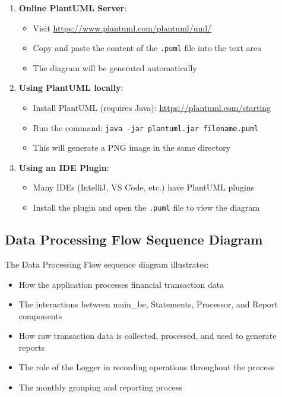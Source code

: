 \documentclass[11pt,a4paper]{report}
\begin{document}
\begin{enumerate}
    \item \textbf{Online PlantUML Server}:
    \begin{itemize}
        \item Visit \url{https://www.plantuml.com/plantuml/uml/}
        \item Copy and paste the content of the \texttt{.puml} file into the text area
        \item The diagram will be generated automatically
    \end{itemize}
    
    \item \textbf{Using PlantUML locally}:
    \begin{itemize}
        \item Install PlantUML (requires Java): \url{https://plantuml.com/starting}
        \item Run the command: \texttt{java -jar plantuml.jar filename.puml}
        \item This will generate a PNG image in the same directory
    \end{itemize}
    
    \item \textbf{Using an IDE Plugin}:
    \begin{itemize}
        \item Many IDEs (IntelliJ, VS Code, etc.) have PlantUML plugins
        \item Install the plugin and open the \texttt{.puml} file to view the diagram
    \end{itemize}
\end{enumerate}

\subsection{Data Processing Flow Sequence Diagram}
The Data Processing Flow sequence diagram illustrates:
\begin{itemize}
    \item How the application processes financial transaction data
    \item The interactions between main\_be, Statements, Processor, and Report components
    \item How raw transaction data is collected, processed, and used to generate reports
    \item The role of the Logger in recording operations throughout the process
    \item The monthly grouping and reporting process
\end{itemize}
\end{document}
